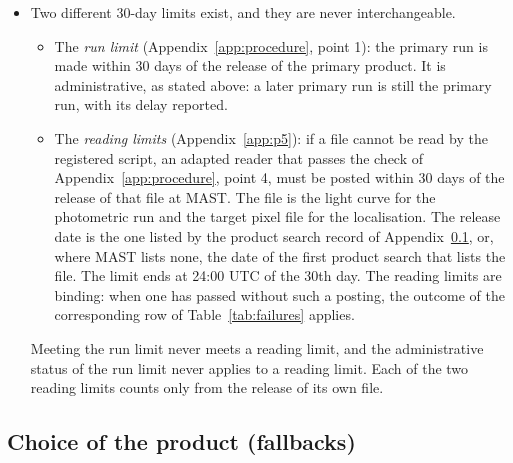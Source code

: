 \begin{itemize}
  of order (no Sector 110 product opened before the primary run, Appendix~\ref{app:procedure}, point 1; variants and
  localisation only after the primary result is posted, point 3), the date 2027 February 28
  (Appendices~\ref{app:data}, \ref{app:variants}, \ref{app:p2} and \ref{app:p5}), and the reading limits of
  Appendix~\ref{app:p5}, which decide an outcome.
\item Two different 30-day limits exist, and they are never interchangeable.
  \begin{itemize}
  \item The \emph{run limit} (Appendix~\ref{app:procedure}, point 1): the primary run is made within 30 days of the
    release of the primary product. It is administrative, as stated above: a later primary run is still the primary
    run, with its delay reported.
  \item The \emph{reading limits} (Appendix~\ref{app:p5}): if a file cannot be read by the registered script, an adapted
    reader that passes the check of Appendix~\ref{app:procedure}, point 4, must be posted within 30 days of the release
    of that file at MAST. The file is the light curve for the photometric run and the target pixel file for the
    localisation. The release date is the one listed by the product search record of Appendix~\ref{app:p2}, or, where
    MAST lists none, the date of the first product search that lists the file. The limit ends at 24:00 UTC of the 30th
    day. The reading limits are binding: when one has passed without such a posting, the outcome of the corresponding
    row of Table~\ref{tab:failures} applies.
  \end{itemize}
  Meeting the run limit never meets a reading limit, and the administrative status of the run limit never applies to a
  reading limit. Each of the two reading limits counts only from the release of its own file.
\end{itemize}

\subsection{Choice of the product (fallbacks)} \label{app:p2}

